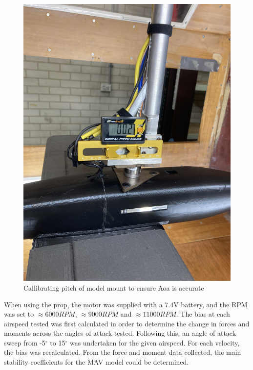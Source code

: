 \begin{figure}[H]
    \centering
    \includegraphics[scale=0.05]{04_Methodology/Figs/pitchGauge.jpg}
    \caption{Callibrating pitch of model mount to ensure Aoa is accurate}
    \label{fig:pitchGauge}
\end{figure}


When using the prop, the motor was supplied with a 7.4V battery, and the RPM was set to $\approx 6000 RPM$, $\approx 9000RPM$ and $\approx 11000 RPM$. The bias at each airspeed tested was first calculated in order to determine the change in forces and moments across the angles of attack tested. Following this, an angle of attack sweep from -5$^{\circ}$ to 15$^{\circ}$ was undertaken for the given airspeed. For each velocity, the bias was recalculated. From the force and moment data collected, the main stability coefficients for the MAV model could be determined.


